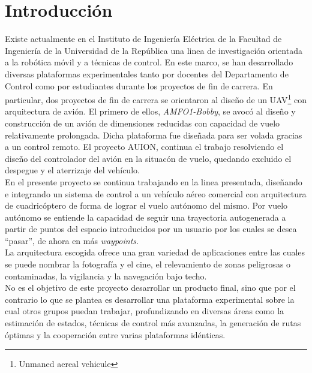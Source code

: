 \documentclass[main]{subfiles}
\begin{document}
\chapter*{Introducci\'on}

Existe actualmente en el Instituto de Ingenier\'ia El\'ectrica de la Facultad de Ingenier\'ia de la Universidad de la Rep\'ublica una linea de investigaci\'on orientada a la rob\'otica m\'ovil y a t\'ecnicas de control. En este marco, se han desarrollado diversas plataformas experimentales tanto por docentes del Departamento de Control como por estudiantes durante los proyectos de fin de carrera. En particular, dos proyectos de fin de carrera se orientaron al diseño de un UAV\footnote{Unmaned aereal vehicule} con arquitectura de avi\'on. El primero de ellos, \emph{AMFO1-Bobby}, se avoc\'o al diseño y construcci\'on de un avi\'on de dimensiones reducidas con capacidad de vuelo relativamente prolongada. Dicha plataforma fue diseñada para ser volada gracias a un control remoto. El proyecto AUION, continua el trabajo resolviendo el diseño del controlador del avi\'on en la situac\'on de vuelo, quedando excluido el despegue y el aterrizaje del veh\'iculo.\\

En el presente proyecto se continua trabajando en la linea presentada, dise\~nando e integrando un sistema de control a un veh\'iculo a\'ereo comercial con arquitectura de cuadric\'optero de forma de lograr el vuelo aut\'onomo del mismo. Por vuelo aut\'onomo se entiende la capacidad de seguir una trayectoria autogenerada a partir de puntos del espacio introducidos por un usuario por los cuales se desea ``pasar'', de ahora en m\'as \emph{waypoints}. \\

La arquitectura escogida ofrece una gran variedad de aplicaciones entre las cuales se puede nombrar la fotograf\'ia y el cine, el relevamiento de zonas peligrosas o contaminadas, la  vigilancia y la navegaci\'on bajo techo. \\

No es el objetivo de este proyecto desarrollar un producto final, sino que por el contrario lo que se plantea es desarrollar una plataforma experimental sobre la cual otros grupos puedan trabajar, profundizando en diversas \'areas como la estimaci\'on de estados, t\'ecnicas de control m\'as avanzadas, la generaci\'on de rutas \'optimas y la cooperaci\'on entre varias plataformas id\'enticas.\\
\end{document}

